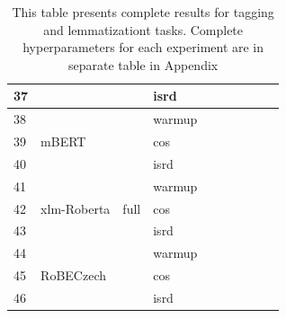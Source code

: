 \begin{table}
{\begin{tabular}{|l|l|l|l||llllll|}
37 &                              &                         & isrd   &        &         &         &          &           &            \\ \hline
38 & \multirow{3}{*}{mBERT}       & \multirow{9}{*}{full}   & warmup &        &         &         &          &           &            \\ \cline{1-1} \cline{4-10} 
39 &                              &                         & cos    &        &         &         &          &           &            \\ \cline{1-1} \cline{4-10} 
40 &                              &                         & isrd   &        &         &         &          &           &            \\ \cline{1-2} \cline{4-10} 
41 & \multirow{3}{*}{xlm-Roberta} &                         & warmup &        &         &         &          &           &            \\ \cline{1-1} \cline{4-10} 
42 &                              &                         & cos    &        &         &         &          &           &            \\ \cline{1-1} \cline{4-10} 
43 &                              &                         & isrd   &        &         &         &          &           &            \\ \cline{1-2} \cline{4-10} 
44 & \multirow{3}{*}{RoBECzech}   &                         & warmup &        &         &         &          &           &            \\ \cline{1-1} \cline{4-10} 
45 &                              &                         & cos    &        &         &         &          &           &            \\ \cline{1-1} \cline{4-10} 
46 &                              &                         & isrd   &        &         &         &          &           &            \\ \hline
\end{tabular}
}
\caption{This table presents complete results for tagging and lemmatizationt tasks.  Complete hyperparameters for each experiment are in separate table in Appendix %
}
\label{tab:all_res_tl}
\end{table}

